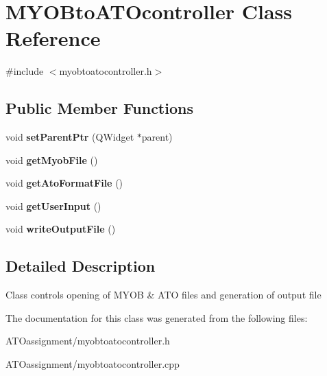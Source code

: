 \hypertarget{class_m_y_o_bto_a_t_ocontroller}{}\section{M\+Y\+O\+Bto\+A\+T\+Ocontroller Class Reference}
\label{class_m_y_o_bto_a_t_ocontroller}


{\ttfamily \#include $<$myobtoatocontroller.\+h$>$}

\subsection*{Public Member Functions}
\begin{DoxyCompactItemize}
\item 
\hypertarget{class_m_y_o_bto_a_t_ocontroller_aa03d6be95c0a32eebc96c0431813a3f8}{}\label{class_m_y_o_bto_a_t_ocontroller_aa03d6be95c0a32eebc96c0431813a3f8} 
void {\bfseries set\+Parent\+Ptr} (Q\+Widget $\ast$parent)
\item 
\hypertarget{class_m_y_o_bto_a_t_ocontroller_a5774289b11ef120689f882c0066703b9}{}\label{class_m_y_o_bto_a_t_ocontroller_a5774289b11ef120689f882c0066703b9} 
void {\bfseries get\+Myob\+File} ()
\item 
\hypertarget{class_m_y_o_bto_a_t_ocontroller_ac8e5aa4de12adf863144591ab9406274}{}\label{class_m_y_o_bto_a_t_ocontroller_ac8e5aa4de12adf863144591ab9406274} 
void {\bfseries get\+Ato\+Format\+File} ()
\item 
\hypertarget{class_m_y_o_bto_a_t_ocontroller_aafb6a40b055056c0e5f2bce7e1eeee1d}{}\label{class_m_y_o_bto_a_t_ocontroller_aafb6a40b055056c0e5f2bce7e1eeee1d} 
void {\bfseries get\+User\+Input} ()
\item 
\hypertarget{class_m_y_o_bto_a_t_ocontroller_a886b2c3dc8e45390d15c272d54d90f4c}{}\label{class_m_y_o_bto_a_t_ocontroller_a886b2c3dc8e45390d15c272d54d90f4c} 
void {\bfseries write\+Output\+File} ()
\end{DoxyCompactItemize}


\subsection{Detailed Description}
Class controls opening of M\+Y\+OB \& A\+TO files and generation of output file 

The documentation for this class was generated from the following files\+:\begin{DoxyCompactItemize}
\item 
A\+T\+Oassignment/myobtoatocontroller.\+h\item 
A\+T\+Oassignment/myobtoatocontroller.\+cpp\end{DoxyCompactItemize}
